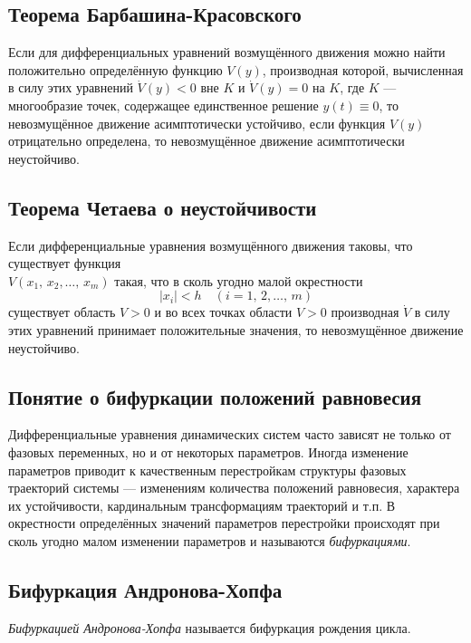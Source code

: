 \documentclass[a4paper,12pt]{article}
\begin{document}
\subsection{Теорема Барбашина-Красовского}
\begin{thm}
	Если для дифференциальных уравнений возмущённого движения можно найти
	положительно определённую функцию $V(y)$, производная которой,
	вычисленная в силу этих уравнений $\dot{V}(y)<0$ вне $K$ и
	$\dot{V}(y)=0$ на $K$, где $K$  --- многообразие точек, содержащее
	единственное решение $y(t) \equiv 0$, то невозмущённое движение
	асимптотически устойчиво, если функция $V(y)$ отрицательно определена,
	то невозмущённое движение асимптотически неустойчиво.
\end{thm}
\subsection{Теорема Четаева о неустойчивости}
\begin{thm}
	Если дифференциальные уравнения возмущённого движения таковы, что
	существует функция\\$V(x_1,\,x_2,\ldots,\,x_m)$
	такая, что в сколь угодно
	малой  окрестности
	 \[
		 |x_i|<h \quad (i=1,\,2,\ldots,\,m)
	\] 
	существует область $V>0$ и во всех точках области $V>0$ производная
	$\dot{V}$ в силу этих уравнений принимает положительные значения, то
	невозмущённое движение неустойчиво.
\end{thm}
\subsection{Понятие о бифуркации положений равновесия}
Дифференциальные уравнения динамических систем часто зависят не только от
фазовых переменных, но и от некоторых параметров.
Иногда изменение параметров приводит к качественным перестройкам  структуры
фазовых траекторий системы --- изменениям количества положений равновесия,
характера их устойчивости, кардинальным трансформациям траекторий и т.\;п.
В окрестности определённых значений параметров перестройки происходят при
сколь угодно малом изменении параметров и называются \emph{бифуркациями}.
\subsection{Бифуркация Андронова-Хопфа}
\emph{Бифуркацией Андронова-Хопфа} называется бифуркация рождения цикла.
\end{document}
